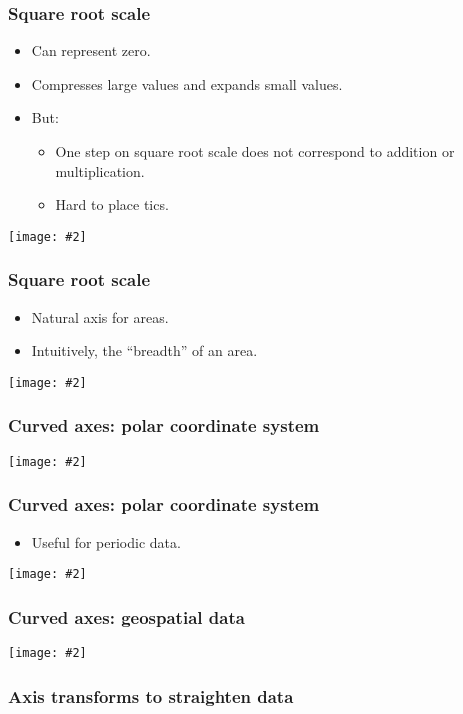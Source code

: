 \documentclass{beamer}
\newcommand{\bi}{\begin{itemize}}
\newcommand{\li}{\item}
\newcommand{\ei}{\end{itemize}}
\newcommand{\fig}[2]{\centerline{\texttt{[image: \#2]}}}
\newcommand{\bfr}[1]{\begin{frame}[fragile]\frametitle{{ #1 }}}
\begin{document}
\bfr{Square root scale}
\bi
\li Can represent zero.
\li Compresses large values and expands small values.
\li But:\bi
\li One step on square root scale does not correspond to addition or multiplication.
\li Hard to place tics. 
\ei
\ei
\fig{.7}{sqrt-scales-1.png}
\end{frame}

\bfr{Square root scale}
\bi
\li Natural axis for areas.
\li Intuitively, the ``breadth'' of an area.
\ei
\fig{1}{northeast-state-areas-1.png}
\end{frame}

\bfr{Curved axes: polar coordinate system}
\fig{1}{polar-coord-1.png}
\end{frame}

\bfr{Curved axes: polar coordinate system}
\bi
\li Useful for periodic data.
\ei
\fig{1}{temperature-normals-polar-1.png}
\end{frame}

\bfr{Curved axes: geospatial data}

\fig{1}{worldmap-four-projections-1.png}
\end{frame}


\bfr{Axis transforms to straighten data}
\end{frame}
\end{document}
